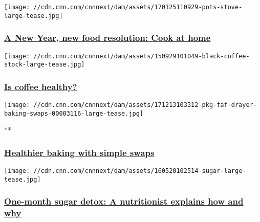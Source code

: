 \href{/2017/12/25/health/cook-at-home-food-resolution-drayer/index.html}{}

\texttt{[image: //cdn.cnn.com/cnnnext/dam/assets/170125110929-pots-stove-large-tease.jpg]}

\hypertarget{a-new-year-new-food-resolution-cook-at-home}{%
\subsubsection{\texorpdfstring{\href{/2017/12/25/health/cook-at-home-food-resolution-drayer/index.html}{A
New Year, new food resolution: Cook at
home}}{A New Year, new food resolution: Cook at home}}\label{a-new-year-new-food-resolution-cook-at-home}}

\href{/2017/09/29/health/coffee-healthy-food-drayer/index.html}{}

\texttt{[image: //cdn.cnn.com/cnnnext/dam/assets/150929101049-black-coffee-stock-large-tease.jpg]}

\hypertarget{is-coffee-healthy}{%
\subsubsection{\texorpdfstring{\href{/2017/09/29/health/coffee-healthy-food-drayer/index.html}{Is
coffee healthy?}}{Is coffee healthy?}}\label{is-coffee-healthy}}

\href{/videos/health/2017/12/13/pkg-faf-drayer-baking-swaps.cnn}{}

\texttt{[image: //cdn.cnn.com/cnnnext/dam/assets/171213103312-pkg-faf-drayer-baking-swaps-00003116-large-tease.jpg]}

**

\hypertarget{healthier-baking-with-simple-swaps}{%
\subsubsection{\texorpdfstring{\href{/videos/health/2017/12/13/pkg-faf-drayer-baking-swaps.cnn}{Healthier
baking with simple
swaps}}{Healthier baking with simple swaps}}\label{healthier-baking-with-simple-swaps}}

\href{/2017/06/09/health/sugar-detox-food-drayer/index.html}{}

\texttt{[image: //cdn.cnn.com/cnnnext/dam/assets/160520102514-sugar-large-tease.jpg]}

\hypertarget{one-month-sugar-detox-a-nutritionist-explains-how-and-why}{%
\subsubsection{\texorpdfstring{\href{/2017/06/09/health/sugar-detox-food-drayer/index.html}{One-month
sugar detox: A nutritionist explains how and
why}}{One-month sugar detox: A nutritionist explains how and why}}\label{one-month-sugar-detox-a-nutritionist-explains-how-and-why}}

